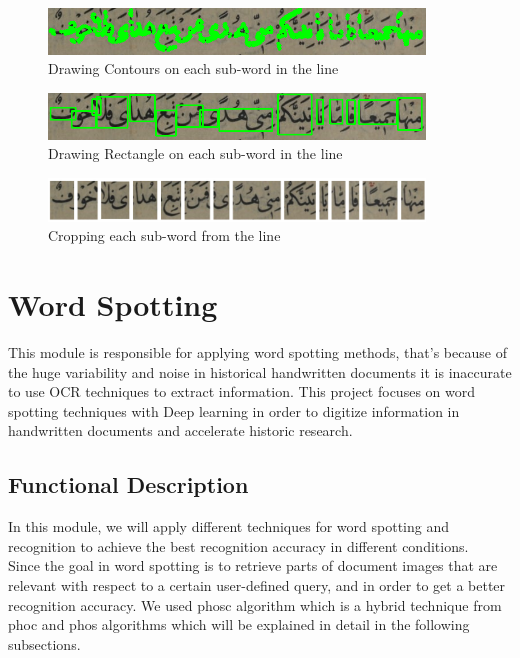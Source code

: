 \begin{figure}[!htb]
    \centering
    \includegraphics[width=10cm]{images/con2.png}
    \caption{Drawing Contours on each sub-word in the line}
    \label{fig:con2}
\end{figure} 

\begin{figure}[!htb]
    \centering
    \includegraphics[width=10cm]{images/con4.png}
    \caption{Drawing Rectangle on each sub-word in the line}
    \label{fig:con4}
\end{figure} 

\begin{figure}[!htb]
    \centering
    \includegraphics[width=10cm]{images/crops.png}
    \caption{Cropping each sub-word from the line}
    \label{fig:crops}
\end{figure} 

\section{Word Spotting}
This module is responsible for applying word spotting methods, that's because of the huge variability and noise in historical handwritten documents it is inaccurate to use OCR techniques to extract information. This project focuses on word spotting techniques with Deep learning in order to digitize information in handwritten documents and accelerate historic research.

\subsection{Functional Description}
In this module, we will apply different techniques for word spotting and recognition to achieve the best recognition accuracy in different conditions. \\

Since the goal in word spotting is to retrieve parts of document images that are relevant with respect to a certain user-defined query, and in order to get a better recognition accuracy. We used \acrshort{phosc} algorithm which is a hybrid technique from \acrshort{phoc} and \acrshort{phos} algorithms which will be explained in detail in the following subsections. 

